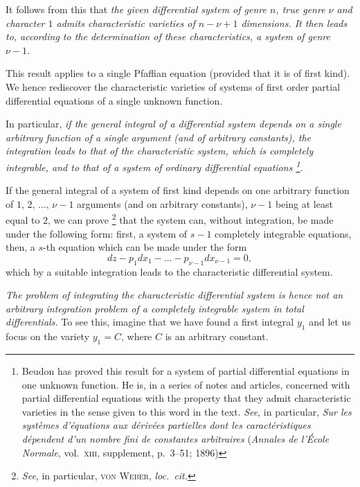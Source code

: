 \documentclass[leqno,11pt]{book}
\theoremstyle{shape1}
\theoremstyle{shapesmall}
\begin{document}
It follows from this that \emph{the given differential system of genre $n$, true genre $\nu$ and character $1$ admits characteristic varieties of $n-\nu+1$ dimensions. It then leads to, according to the determination of these characteristics, a system of genre $\nu-1$.}

This result applies to a single Pfaffian equation (provided that it is of first kind). We hence rediscover the characteristic varieties of systems of first order partial differential equations of a single unknown function.

In particular, \emph{if the general integral of a differential system depends on a single arbitrary function of a single argument (and of arbitrary constants), the integration leads to that of the characteristic system, which is completely integrable, and to that of a system of ordinary differential equations \footnote{Beudon has proved this result for a system of partial differential equations in one unknown function. He is, in a series of notes and articles, concerned with partial differential equations with the property that they admit characteristic varieties in the sense given to this word in the text. \emph{See}, in particular, \emph{Sur les systèmes d'équations aux dérivées partielles dont les caractéristiques dépendent d'un nombre fini de constantes arbitraires} (\emph{Annales de l'École Normale}, vol.~\textsc{xiii}, supplement, p.~3--51; 1896)}.}

If the general integral of a system of first kind depends on one arbitrary function of $1$, $2$, $\dots$, $\nu-1$ arguments (and on arbitrary constants), $\nu-1$ being at least equal to $2$, we can prove \footnote{\emph{See}, in particular, \textsc{von Weber}, \emph{loc.~cit.}} that the system can, without integration, be made under the following form: first, a system of $s-1$ completely integrable equations, then, a $s$-th equation which can be made under the form
\[
dz-p_{1}dx_{1}-\dots-p_{\nu-1}dx_{\nu-1}=0,
\]
which by a suitable integration leads to the characteristic differential system.

\emph{The problem of integrating the characteristic differential system is hence not an arbitrary integration problem of a completely integrable system in total differentials.} To see this, imagine that we have found a first integral $y_{1}$ and let us focus on the variety $y_{1}=C$, where $C$ is an arbitrary constant.
\end{document}
